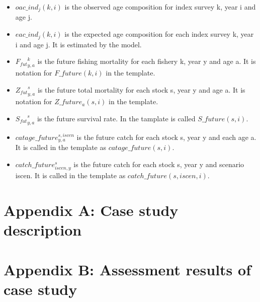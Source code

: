 \documentclass{article}
\begin{document}
\begin{itemize}
    \item $oac\_ind_j(k,i)$ is the observed age composition for index survey k, year i and age j.
    \item $eac\_ind_j(k,i)$ is the expected age composition for each index survey k, year i and age j. It is estimated by the model.
    \item ${F_{fut}}^{k}_{y,a}$  is the future  fishing mortality  for each fishery k, year y and age a. It is notation for $F\_future(k,i)$ in the template.
    \item ${Z_{fut}}^s_{y,a}$ is the future total mortality for each stock s, year y and age a. It is notation for $Z\_future_a(s,i)$ in the template.
    \item ${S_{fut}}^s_{y,a}$ is the future survival rate. In the tamplate is called $S\_future(s,i)$.
    \item $catage\_future^{s,iscen}_{y,a}$ is the future catch for each stock s, year y and each age a. It is called in the template as 
 $catage\_future(s,i)$.
    \item $catch\_future^s_{iscen,y}$ is the future catch for each stock s, year y and scenario iscen. It is called in the template as $catch\_future(s,iscen,i)$.
    \end{itemize}
    \section{Appendix A: Case study description}
\label{section:AppendixA}
\section{Appendix B: Assessment results of case study}
\label{section:AppendixB}
 
\printbibliography
    
\end{document}
